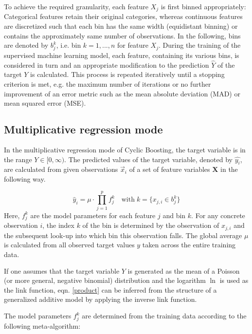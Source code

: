 \documentclass[BCOR=1mm, DIV=calc,10pt,
twoside=true,
twocolumn,
headings=normal]{scrartcl}
\begin{document}
To achieve the required granularity, each feature $X_j$ is first binned appropriately:
Categorical features retain their original categories, whereas continuous features are
discretized such that each bin has the same width (equidistant binning) or contains the
approximately same number of observations. In the following, bins are denoted by $b^k_j$,
i.e. bin $k = 1,..., n$ for feature $X_j$. During the training of the supervised machine
learning model, each feature, containing its various bins, is considered in turn and an
appropriate modification to the prediction $\hat{Y}$ of the target $Y$ is calculated. This
process is repeated iteratively until a stopping criterion is met, e.g. the maximum number
of iterations or no further improvement of an error metric such as the mean absolute
deviation (MAD) or mean squared error (MSE).


\subsection{Multiplicative regression mode}
\label{multiregmode}

In the multiplicative regression mode of Cyclic Boosting, the target variable is in the
range $Y \in [0,\infty)$. The predicted values of the target variable, denoted by
$\hat{y_i}$, are calculated from given observations $\vec{x}_i$ of a set of feature
variables $\bm{X}$ in the following way.

\begin{equation} \label{product}
\hat{y}_i = \mu \cdot \prod \limits_{j=1}^p f^k_j \quad \text{with}\; k=\{ x_{j,i} \in b^k_j\}
\end{equation}
Here, $f^k_j$ are the model parameters for each feature $j$ and bin $k$. For any concrete
observation $i$, the index $k$ of the bin is determined by the observation of $x_{j,i}$
and the subsequent look-up into which bin this observation falls. The global average $\mu$
is calculated from all observed target values $y$ taken across the entire training data.

If one assumes that the target variable $Y$ is generated as the mean of a Poisson (or more
general, negative binomial) distribution and the logarithm  $\ln$ is used as the link
function, eqn. \ref{product} can be inferred from the structure of a generalized additive
model by applying the inverse link function.

The model parameters $f^k_j$ are determined from the training data according to the
following meta-algorithm:
\end{document}
